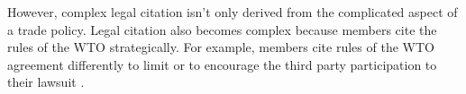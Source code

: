 However, complex legal citation isn't only derived from the complicated aspect of a trade policy.
Legal citation also becomes complex because members cite the rules of the WTO strategically. For example,
members cite rules of the WTO agreement differently to limit or to encourage 
the third party participation to their lawsuit \cite{who_gets}.


